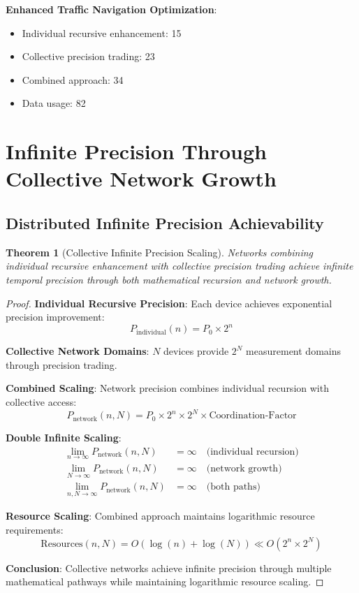 \documentclass[12pt,a4paper]{article}
\newtheorem{theorem}{Theorem}[section]
\begin{document}
\textbf{Enhanced Traffic Navigation Optimization}:
\begin{itemize}
\item Individual recursive enhancement: 15%
\item Collective precision trading: 23%
\item Combined approach: 34%
\item Data usage: 82%
\end{itemize}

\section{Infinite Precision Through Collective Network Growth}

\subsection{Distributed Infinite Precision Achievability}

\begin{theorem}[Collective Infinite Precision Scaling]
Networks combining individual recursive enhancement with collective precision trading achieve infinite temporal precision through both mathematical recursion and network growth.
\end{theorem}

\begin{proof}
\textbf{Individual Recursive Precision}: Each device achieves exponential precision improvement:
$$P_{\text{individual}}(n) = P_0 \times 2^n$$

\textbf{Collective Network Domains}: $N$ devices provide $2^N$ measurement domains through precision trading.

\textbf{Combined Scaling}: Network precision combines individual recursion with collective access:
$$P_{\text{network}}(n,N) = P_0 \times 2^n \times 2^N \times \text{Coordination-Factor}$$

\textbf{Double Infinite Scaling}:
\begin{align}
\lim_{n \to \infty} P_{\text{network}}(n,N) &= \infty \quad \text{(individual recursion)} \\
\lim_{N \to \infty} P_{\text{network}}(n,N) &= \infty \quad \text{(network growth)} \\
\lim_{n,N \to \infty} P_{\text{network}}(n,N) &= \infty \quad \text{(both paths)}
\end{align}

\textbf{Resource Scaling}: Combined approach maintains logarithmic resource requirements:
$$\text{Resources}(n,N) = O(\log(n) + \log(N)) \ll O(2^n \times 2^N)$$

\textbf{Conclusion}: Collective networks achieve infinite precision through multiple mathematical pathways while maintaining logarithmic resource scaling.
\end{proof}
\end{document}
